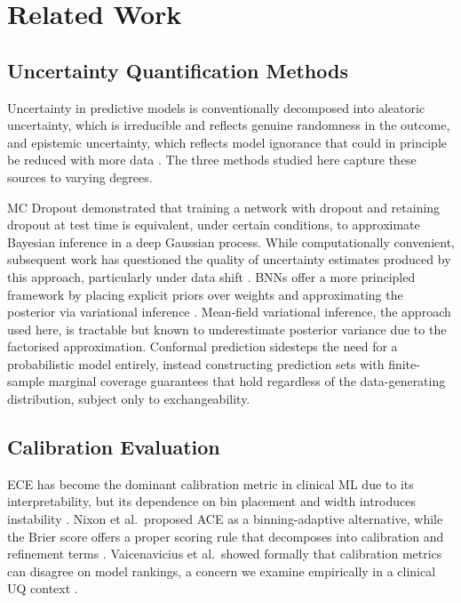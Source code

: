 \documentclass[11pt,a4paper]{article}
\begin{document}
\section{Related Work}
\label{sec:related}

\subsection{Uncertainty Quantification Methods}

Uncertainty in predictive models is conventionally decomposed into aleatoric uncertainty, which is irreducible and reflects genuine randomness in the outcome, and epistemic uncertainty, which reflects model ignorance that could in principle be reduced with more data \citep{hullermeier2021}. The three methods studied here capture these sources to varying degrees.

MC Dropout \citep{gal2016} demonstrated that training a network with dropout and retaining dropout at test time is equivalent, under certain conditions, to approximate Bayesian inference in a deep Gaussian process. While computationally convenient, subsequent work has questioned the quality of uncertainty estimates produced by this approach, particularly under data shift \citep{ovadia2019}. BNNs offer a more principled framework by placing explicit priors over weights and approximating the posterior via variational inference \citep{blundell2015}. Mean-field variational inference, the approach used here, is tractable but known to underestimate posterior variance due to the factorised approximation. Conformal prediction \citep{vovk2005,papadopoulos2002} sidesteps the need for a probabilistic model entirely, instead constructing prediction sets with finite-sample marginal coverage guarantees that hold regardless of the data-generating distribution, subject only to exchangeability.

\subsection{Calibration Evaluation}

ECE has become the dominant calibration metric in clinical ML due to its interpretability, but its dependence on bin placement and width introduces instability \citep{nixon2019}. Nixon et al.\ proposed ACE as a binning-adaptive alternative, while the Brier score offers a proper scoring rule that decomposes into calibration and refinement terms \citep{brier1950}. Vaicenavicius et al.\ showed formally that calibration metrics can disagree on model rankings, a concern we examine empirically in a clinical UQ context \citep{vaicenavicius2019}.
\end{document}
